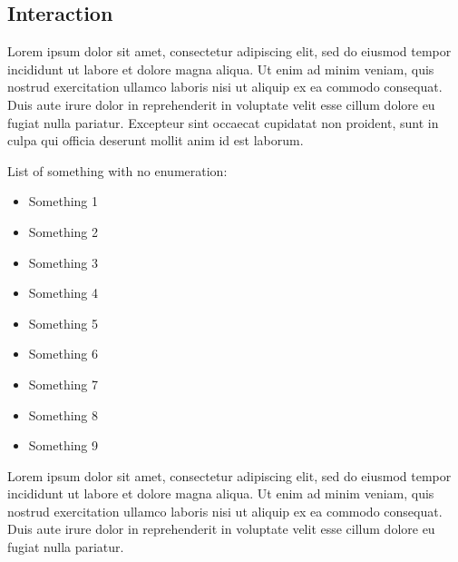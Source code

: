 \subsection{Interaction}

Lorem ipsum dolor sit amet, consectetur adipiscing elit, sed do eiusmod tempor incididunt ut labore et dolore magna aliqua. Ut enim ad minim veniam, quis nostrud exercitation ullamco laboris nisi ut aliquip ex ea commodo consequat. Duis aute irure dolor in reprehenderit in voluptate velit esse cillum dolore eu fugiat nulla pariatur. Excepteur sint occaecat cupidatat non proident, sunt in culpa qui officia deserunt mollit anim id est laborum.


\hfill


\hfill


\hfill

List of something with no enumeration:

\hfill

\begin{itemize}
  \item Something 1
  \item Something 2
  \item Something 3
  \item Something 4
  \item Something 5
  \item Something 6
  \item Something 7
  \item Something 8
  \item Something 9
\end{itemize}

\hfill


Lorem ipsum dolor sit amet, consectetur adipiscing elit, sed do eiusmod tempor incididunt ut labore et dolore magna aliqua. Ut enim ad minim veniam, quis nostrud exercitation ullamco laboris nisi ut aliquip ex ea commodo consequat. Duis aute irure dolor in reprehenderit in voluptate velit esse cillum dolore eu fugiat nulla pariatur.